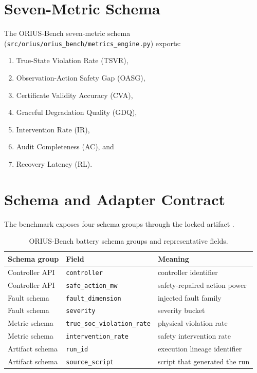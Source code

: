 \section{Seven-Metric Schema}

The ORIUS-Bench seven-metric schema
(\texttt{src/orius/orius\_bench/metrics\_engine.py}) exports:

\begin{enumerate}
  \item True-State Violation Rate (TSVR),
  \item Observation-Action Safety Gap (OASG),
  \item Certificate Validity Accuracy (CVA),
  \item Graceful Degradation Quality (GDQ),
  \item Intervention Rate (IR),
  \item Audit Completeness (AC), and
  \item Recovery Latency (RL).
\end{enumerate}

\section{Schema and Adapter Contract}

The benchmark exposes four schema groups through the locked artifact
.

\begin{table}[ht]
\centering
\caption{ORIUS-Bench battery schema groups and representative fields.}
\label{tab:orius-bench-schema}
\begin{tabular}{lll}
\toprule
\textbf{Schema group} & \textbf{Field} & \textbf{Meaning} \\
\midrule
Controller API & \texttt{controller} & controller identifier \\
Controller API & \texttt{safe\_action\_mw} & safety-repaired action power \\
Fault schema & \texttt{fault\_dimension} & injected fault family \\
Fault schema & \texttt{severity} & severity bucket \\
Metric schema & \texttt{true\_soc\_violation\_rate} & physical violation rate \\
Metric schema & \texttt{intervention\_rate} & safety intervention rate \\
Artifact schema & \texttt{run\_id} & execution lineage identifier \\
Artifact schema & \texttt{source\_script} & script that generated the run \\
\bottomrule
\end{tabular}
\end{table}

